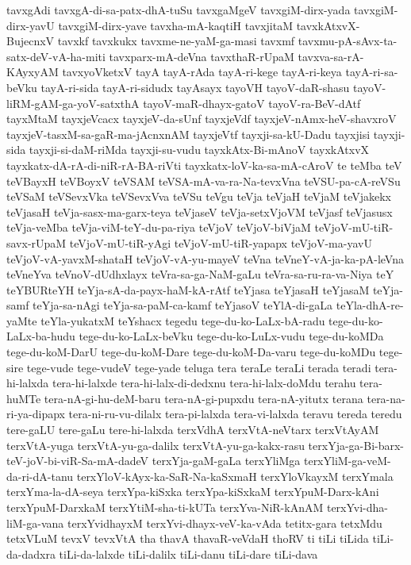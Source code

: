 {tavxgAdi
tavxgA-di-sa-patx-dhA-tuSu
tavxgaMgeV
tavxgiM-dirx-yada
tavxgiM-dirx-yavU
tavxgiM-dirx-yave
tavxha-mA-kaqtiH
tavxjitaM
tavxkAtxvX-BujecnxV
tavxkf
tavxkukx
tavxme-ne-yaM-ga-masi
tavxmf
tavxmu-pA-sAvx-ta-satx-deV-vA-ha-miti
tavxparx-mA-deVna
tavxthaR-rUpaM
tavxva-sa-rA-KAyxyAM
tavxyoVketxV
tayA
tayA-rAda
tayA-ri-kege
tayA-ri-keya
tayA-ri-sa-beVku
tayA-ri-sida
tayA-ri-sidudx
tayAsayx
tayoVH
tayoV-daR-shasu
tayoV-liRM-gAM-ga-yoV-satxthA
tayoV-maR-dhayx-gatoV
tayoV-ra-BeV-dAtf
tayxMtaM
tayxjeVcacx
tayxjeV-da-sUnf
tayxjeVdf
tayxjeV-nAmx-heV-shavxroV
tayxjeV-tasxM-sa-gaR-ma-jAcnxnAM
tayxjeVtf
tayxji-sa-kU-Dadu
tayxjisi
tayxji-sida
tayxji-si-daM-riMda
tayxji-su-vudu
tayxkAtx-Bi-mAnoV
tayxkAtxvX
tayxkatx-dA-rA-di-niR-rA-BA-riVti
tayxkatx-loV-ka-sa-mA-cAroV
te
teMba
teV
teVBayxH
teVBoyxV
teVSAM
teVSA-mA-va-ra-Na-tevxVna
teVSU-pa-cA-reVSu
teVSaM
teVSevxVka
teVSevxVva
teVSu
teVgu
teVja
teVjaH
teVjaM
teVjakekx
teVjasaH
teVja-sasx-ma-garx-teya
teVjaseV
teVja-setxVjoVM
teVjasf
teVjasusx
teVja-veMba
teVja-viM-teY-du-pa-riya
teVjoV
teVjoV-biVjaM
teVjoV-mU-tiR-savx-rUpaM
teVjoV-mU-tiR-yAgi
teVjoV-mU-tiR-yapapx
teVjoV-ma-yavU
teVjoV-vA-yavxM-shataH
teVjoV-vA-yu-mayeV
teVna
teVneY-vA-ja-ka-pA-leVna
teVneYva
teVnoV-dUdhxlayx
teVra-sa-ga-NaM-gaLu
teVra-sa-ru-ra-va-Niya
teY
teYBURteYH
teYja-sA-da-payx-haM-kA-rAtf
teYjasa
teYjasaH
teYjasaM
teYja-samf
teYja-sa-nAgi
teYja-sa-paM-ca-kamf
teYjasoV
teYlA-di-gaLa
teYla-dhA-re-yaMte
teYla-yukatxM
teYshacx
tegedu
tege-du-ko-LaLx-bA-radu
tege-du-ko-LaLx-ba-hudu
tege-du-ko-LaLx-beVku
tege-du-ko-LuLx-vudu
tege-du-koMDa
tege-du-koM-DarU
tege-du-koM-Dare
tege-du-koM-Da-varu
tege-du-koMDu
tege-sire
tege-vude
tege-vudeV
tege-yade
teluga
tera
teraLe
teraLi
terada
teradi
tera-hi-lalxda
tera-hi-lalxde
tera-hi-lalx-di-dedxnu
tera-hi-lalx-doMdu
terahu
tera-huMTe
tera-nA-gi-hu-deM-baru
tera-nA-gi-pupxdu
tera-nA-yitutx
terana
tera-na-ri-ya-dipapx
tera-ni-ru-vu-dilalx
tera-pi-lalxda
tera-vi-lalxda
teravu
tereda
teredu
tere-gaLU
tere-gaLu
tere-hi-lalxda
terxVdhA
terxVtA-neVtarx
terxVtAyAM
terxVtA-yuga
terxVtA-yu-ga-dalilx
terxVtA-yu-ga-kakx-rasu
terxYja-ga-Bi-barx-teV-joV-bi-viR-Sa-mA-dadeV
terxYja-gaM-gaLa
terxYliMga
terxYliM-ga-veM-da-ri-dA-tanu
terxYloV-kAyx-ka-SaR-Na-kaSxmaH
terxYloVkayxM
terxYmala
terxYma-la-dA-seya
terxYpa-kiSxka
terxYpa-kiSxkaM
terxYpuM-Darx-kAni
terxYpuM-DarxkaM
terxYtiM-sha-ti-kUTa
terxYva-NiR-kAnAM
terxYvi-dha-liM-ga-vana
terxYvidhayxM
terxYvi-dhayx-veV-ka-vAda
tetitx-gara
tetxMdu
tetxVLuM
tevxV
tevxVtA
tha
thavA
thavaR-veVdaH
thoRV
ti
tiLi
tiLida
tiLi-da-dadxra
tiLi-da-lalxde
tiLi-dalilx
tiLi-danu
tiLi-dare
tiLi-dava
}
